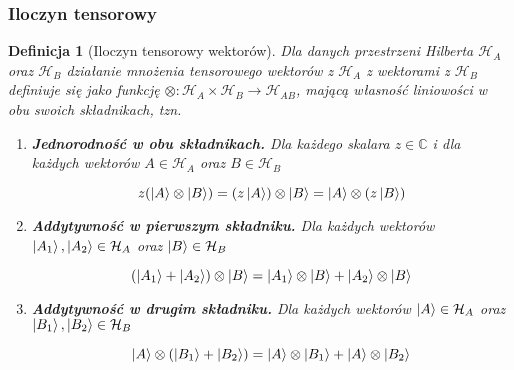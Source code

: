 \documentclass[a4paper,12pt]{article}
\newtheorem{definition}{Definicja}
\begin{document}
\subsubsection{Iloczyn tensorowy}

\begin{definition}[Iloczyn tensorowy wektorów]
    Dla danych przestrzeni Hilberta $\mathcal{H}_A$ oraz $\mathcal{H}_B$ działanie mnożenia tensorowego wektorów z $\mathcal{H}_A$ z wektorami z $\mathcal{H}_B$ definiuje się jako funkcję $\otimes: \mathcal{H}_A \times \mathcal{H}_B \rightarrow \mathcal{H}_{AB}$, mającą własność liniowości w obu swoich składnikach, tzn.

    \begin{enumerate}
        \item \textbf{Jednorodność w obu składnikach.}
            Dla każdego skalara $z \in \mathbb{C}$ i dla każdych wektorów $A \in \mathcal{H}_A$ oraz $B \in \mathcal{H}_B$

            $$
                z (\ket{A} \otimes \ket{B}) = (z \ket{A}) \otimes \ket{B} = \ket{A} \otimes (z \ket{B})
            $$
        \item \textbf{Addytywność w pierwszym składniku.}
            Dla każdych wektorów $\ket{A_1}, \ket{A_2} \in \mathcal {H}_A$ oraz $\ket{B} \in \mathcal{H}_B$

            $$
                (\ket{A_1} + \ket{A_2}) \otimes \ket{B} = \ket{A_1} \otimes \ket{B} + \ket{A_2} \otimes \ket{B}
            $$
        \item \textbf{Addytywność w drugim składniku.}
            Dla każdych wektorów $\ket{A} \in \mathcal{H}_A$ oraz $\ket{B_1}, \ket{B_2} \in \mathcal{H}_B$

            $$
                \ket{A} \otimes (\ket{B_1} + \ket{B_2}) = \ket{A} \otimes \ket{B_1} + \ket{A} \otimes \ket{B_2}
            $$
    \end{enumerate}

\end{definition}
\end{document}

